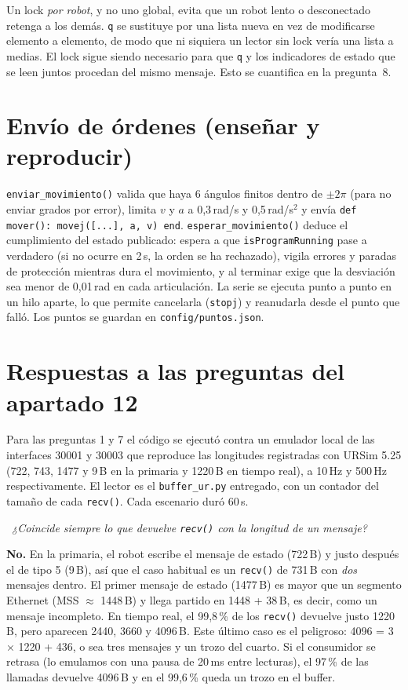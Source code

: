 \documentclass[10pt,a4paper]{article}
\newcommand{\code}[1]{\texttt{\small #1}}
\newcommand{\preg}[2]{\par\smallskip\noindent{\color{azul}\bfseries P#1.}~{\itshape #2}\par\nopagebreak}
\begin{document}
Un lock \emph{por robot}, y no uno global, evita que un robot lento o desconectado retenga a los demás. \code{q} se sustituye por una lista nueva en vez de modificarse elemento a elemento, de modo que ni siquiera un lector sin lock vería una lista a medias. El lock sigue siendo necesario para que \code{q} y los indicadores de estado que se leen juntos procedan del mismo mensaje. Esto se cuantifica en la pregunta~8.

\section{Envío de órdenes (enseñar y reproducir)}

\code{enviar\_movimiento()} valida que haya 6 ángulos finitos dentro de $\pm2\pi$ (para no enviar grados por error), limita $v$ y $a$ a 0,3\,rad/s y 0,5\,rad/s$^2$ y envía \code{def mover(): movej([...], a, v) end}. \code{esperar\_movimiento()} deduce el cumplimiento del estado publicado: espera a que \code{isProgramRunning} pase a verdadero (si no ocurre en 2\,s, la orden se ha rechazado), vigila errores y paradas de protección mientras dura el movimiento, y al terminar exige que la desviación sea menor de 0,01\,rad en cada articulación. La serie se ejecuta punto a punto en un hilo aparte, lo que permite cancelarla (\code{stopj}) y reanudarla desde el punto que falló. Los puntos se guardan en \code{config/puntos.json}.

\section{Respuestas a las preguntas del apartado 12}

Para las preguntas 1 y 7 el código se ejecutó contra un emulador local de las interfaces 30001 y 30003 que reproduce las longitudes registradas con URSim 5.25 (722, 743, 1477 y 9\,B en la primaria y 1220\,B en tiempo real), a 10\,Hz y 500\,Hz respectivamente. El lector es el \code{buffer\_ur.py} entregado, con un contador del tamaño de cada \code{recv()}. Cada escenario duró 60\,s.

\preg{1}{¿Coincide siempre lo que devuelve \code{recv()} con la longitud de un mensaje?}\label{sec:p1}
\textbf{No.} En la primaria, el robot escribe el mensaje de estado (722\,B) y justo después el de tipo 5 (9\,B), así que el caso habitual es un \code{recv()} de 731\,B con \emph{dos} mensajes dentro. El primer mensaje de estado (1477\,B) es mayor que un segmento Ethernet (MSS $\approx$ 1448\,B) y llega partido en 1448 + 38\,B, es decir, como un mensaje incompleto. En tiempo real, el 99,8\,\% de los \code{recv()} devuelve justo 1220\,B, pero aparecen 2440, 3660 y 4096\,B. Este último caso es el peligroso: 4096 = 3 × 1220 + 436, o sea tres mensajes y un trozo del cuarto. Si el consumidor se retrasa (lo emulamos con una pausa de 20\,ms entre lecturas), el 97\,\% de las llamadas devuelve 4096\,B y en el 99,6\,\% queda un trozo en el buffer.
\end{document}
